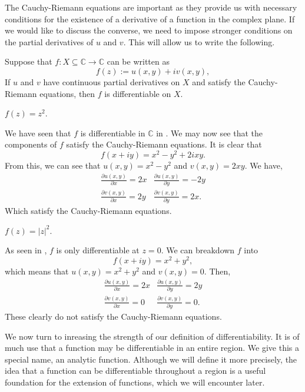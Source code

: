 \documentclass[12pt]{book}
\begin{document}
The Cauchy-Riemann equations are important as they provide us with necessary conditions for the existence of a derivative of a function in the complex plane. If we would like to discuss the converse, we need to impose stronger conditions on the partial derivatives of $u$ and $v$. This will allow us to write the following.
\begin{thm}
    Suppose that $f: X \subseteq \mathbb{C} \rightarrow \mathbb{C}$ can be written as 
    $$
        f(z) := u(x, y) + iv(x, y),
    $$
    If $u$ and $v$ have continuous partial derivatives on $X$ and satisfy the Cauchy-Riemann equations, then $f$ is differentiable on $X$.
\end{thm}

\begin{exmp}
    $f(z) = z^2.$ 
\end{exmp}
We have seen that $f$ is differentiable in $\mathbb{C}$ in . We may now see that the components of $f$ satisfy the Cauchy-Riemann equations. It is clear that
\[
    f(x + iy) = x^2 - y^2 + 2ixy.
\]
From this, we can see that $u(x, y) = x^2 - y^2$ and $v(x, y) = 2xy$. We have,
\[
    \begin{array}{cc}
        \frac{\partial u(x, y)}{\partial x} = 2x & \frac{\partial u(x, y)}{\partial y} = -2y \\
        \frac{\partial v(x, y)}{\partial x} = 2y & \frac{\partial v(x, y)}{\partial y} = 2x.
    \end{array}
\]
Which satisfy the Cauchy-Riemann equations.

\begin{exmp}
    $f(z) = |z|^2.$
\end{exmp}
As seen in , $f$ is only differentiable at $z = 0.$ We can breakdown $f$ into 
\[
    f(x + iy) = x^2 + y^2,
\]
which means that $u(x, y) = x^2 + y^2$ and $v(x, y) = 0.$ Then,
\[
    \begin{array}{cc}
        \frac{\partial u(x, y)}{\partial x} = 2x & \frac{\partial u(x, y)}{\partial y} = 2y \\
        \frac{\partial v(x, y)}{\partial x} = 0 & \frac{\partial v(x, y)}{\partial y} = 0.
    \end{array}
\]
These clearly do not satisfy the Cauchy-Riemann equations. 

We now turn to inreasing the strength of our definition of differentiability. It is of much use that a function may be differentiable in an entire region. We give this a special name, an analytic function. Although we will define it more precisely, the idea that a function can be differentiable throughout a region is a useful foundation for the extension of functions, which we will encounter later.
\end{document}
